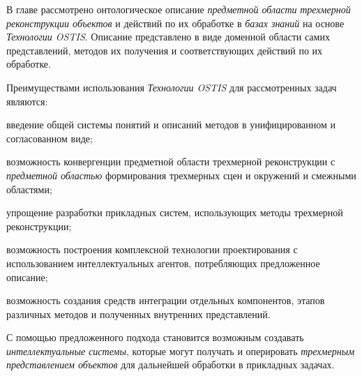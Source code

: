В главе рассмотрено онтологическое описание \textit{предметной области} \textit{трехмерной реконструкции объектов} и действий по их обработке в \textit{базах знаний} на основе \textit{Технологии OSTIS}. Описание представлено в виде доменной области самих представлений, методов их получения и соответствующих действий по их обработке.

Преимуществами использования \textit{Технологии OSTIS} для рассмотренных задач являются:

\begin{textitemize}
    \item введение общей системы понятий и описаний методов в унифицированном и согласованном виде;
    \item возможность конвергенции предметной области трехмерной реконструкции с \textit{предметной областью} формирования трехмерных сцен и окружений и смежными областями;
    \item упрощение разработки прикладных систем, использующих методы трехмерной реконструкции;
    \item возможность построения комплексной технологии проектирования с использованием интеллектуальных агентов, потребляющих предложенное описание;
    \item возможность создания средств интеграции отдельных компонентов, этапов различных методов и полученных внутренних представлений.
\end{textitemize}

С помощью предложенного подхода становится возможным создавать \textit{интеллектуальные системы}, которые могут получать и оперировать \textit{трехмерным представлением объектов} для дальнейшей обработки в прикладных задачах.
